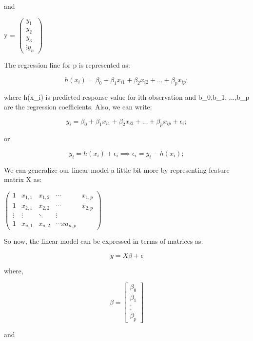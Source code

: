 and

y = $
\begin{pmatrix}
y_{1} \\ y_{2} \\ y_{3} \\
\vdots y_{n}
\end{pmatrix}
$

The regression line for p is represented as:

\begin{equation}
h(x_{i}) = \beta_{0} + \beta_{1}x_{i1}+\beta_{2}x_{i2}+ ... +\beta_{p}x_{ip};
\end{equation}


where h(x\_i) is predicted response value for ith observation and b\_0,b\_1, ...,b\_p are the regression coefficients. 
Also, we can write:

\begin{equation}
y_{i} = \beta_{0} + \beta_{1}x_{i1} + \beta_{2}x_{i2} + ... +\beta_{p}x_{ip} + \epsilon_{i};
\end{equation}

or

\begin{equation}
y_{i} = h(x_{i}) + \epsilon_{i} \implies \epsilon_{i} = y_{i} - h(x_{i});
\end{equation}


We can generalize our linear model a little bit more by representing feature matrix X as:

$\begin{pmatrix}
1 & x_{1,1} & x_{1,2} & \cdots & x_{1,p} \\
1 & x_{2,1} & x_{2,2} & \cdots & x_{2,p} \\
\vdots  & \vdots  & \ddots & \vdots  \\
1 & x_{n,1} & x_{n,2} & \cdots x a_{n,p} 
\end{pmatrix}$


So now, the linear model can be expressed in terms of matrices as:
 
$$
y = X\beta + \epsilon
$$

where,\newline

$$\beta = 
\begin{bmatrix} 
\beta_0\\  \beta_1\\  .\\  .\\  \beta_p 
\end{bmatrix}$$ 

and

